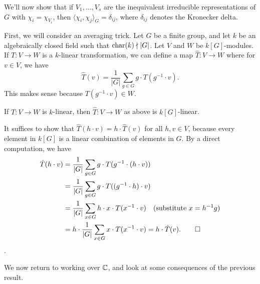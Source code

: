 We'll now show that if $V_1, \dots, V_s$ are the inequivalent irreducible 
representations of $G$ with $\chi_i = \chi_{V_i}$, then $\langle \chi_i, 
\chi_j \rangle_G = \delta_{ij}$, where $\delta_{ij}$ denotes the Kronecker delta. 

First, we will consider an averaging trick. Let $G$ be a finite group, and let 
$k$ be an algebraically closed field such that $\operatorname{char}(k) \nmid |G|$. Let 
$V$ and $W$ be $k[G]$-modules. If $T : V \to W$ is a $k$-linear transformation, 
we can define a map $\hat T : V \to W$ where for $v \in V$, we have 
\[ \hat T(v) = \frac1{|G|} \sum_{g \in G} g \cdot T(g^{-1} \cdot v). \] 
This makes sense because $T(g^{-1} \cdot v) \in W$. 

\begin{thm}
    If $T : V \to W$ is $k$-linear, then $\hat T : V \to W$ as above is 
    $k[G]$-linear. 
\end{thm}
\begin{pf}
    It suffices to show that $\hat T(h \cdot v) = h \cdot \hat T(v)$ for all 
    $h, v \in V$, because every element in $k[G]$ is a linear combination of 
    elements in $G$. By a direct computation, we have 
    \begin{align*}
        \hat T(h \cdot v) 
        &= \frac1{|G|} \sum_{g\in G} g \cdot T(g^{-1} \cdot (h \cdot v)) \\ 
        &= \frac1{|G|} \sum_{g\in G} g \cdot T((g^{-1} \cdot h) \cdot v) \\ 
        &= \frac1{|G|} \sum_{x\in G} h \cdot x \cdot T(x^{-1} \cdot v) 
        \quad \text{(substitute $x = h^{-1}g$)} \\ 
        &= h \cdot \frac1{|G|} \sum_{x\in G} x \cdot T(x^{-1} \cdot v) 
        = h \cdot \hat T(v). \qedhere 
    \end{align*}. 
\end{pf}

We now return to working over $\mathbb{C}$, and look at some consequences of the previous 
result. 

